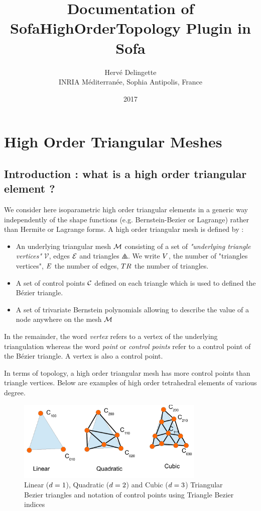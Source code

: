 \documentclass[a4paper,11pt]{article}
\title{Documentation of SofaHighOrderTopology Plugin in Sofa}
\date{2017}
\author{Herv\'e Delingette\\ {\small INRIA M\'editerran\'ee, Sophia Antipolis, France}}
\renewcommand{\vertices}{{\mathcal V}}
\newcommand{\Bezier}{{B{\'e}zier }}
\begin{document}
 
\maketitle

\section{High Order Triangular Meshes}

\subsection{Introduction : what is a high order triangular element ?}

We consider here isoparametric high order triangular  elements in a generic way independently of the shape functions (e.g. Bernstein-Bezier or Lagrange) rather than Hermite or Lagrange forms. 
A high order triangular mesh is defined by :

\begin{itemize}
	\item An underlying triangular mesh ${\mathcal M}$ consisting of a set of {\em "underlying triangle vertices"} $\vertices$, edges ${\mathcal E}$ and triangles $\triangles$. We write ${ V}$, the number of "triangles vertices", ${ E}$ the number of edges, ${ TR}$ the number of triangles. 
	\item A set of control points ${\mathcal C}$ defined on each triangle which is used to defined the \Bezier triangle. 
	\item A set of trivariate Bernstein polynomials  allowing to describe the value of a node anywhere on the mesh ${\mathcal M}$ 
\end{itemize}
%

In the remainder, the word {\em vertex} refers to a vertex of the underlying triangulation whereas the word {\em point} or {\em control points} refer to a control point of the \Bezier triangle. A vertex is also a control point.

In terms of topology, a high order triangular mesh has more control points than triangle vertices.
Below are examples of high order tetrahedral elements of various degree.
\begin{figure}[!htbp]
	\centering
    \includegraphics[width=0.80\textwidth]{bezierTrian}
	\caption{Linear (${d}=1$), Quadratic (${d}=2$) and Cubic (${d}=3$) Triangular Bezier triangles and notation of control points using Triangle Bezier indices}
	\label{fig:LinearQuadraticAndCubicTriangularElements}
\end{figure}
\end{document}
